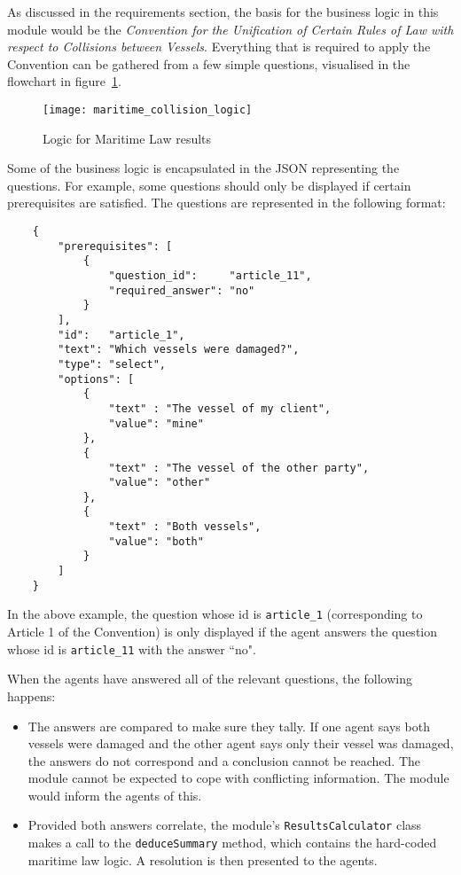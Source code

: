 As discussed in the requirements section, the basis for the business logic in this module would be the \emph{Convention for the Unification of Certain Rules of Law with respect to Collisions between Vessels}. Everything that is required to apply the Convention can be gathered from a few simple questions, visualised in the flowchart in figure~\ref{uml:maritimeLogic}.

\begin{figure}[h!]
  \centering
    \ifimages
    \texttt{[image: maritime\_collision\_logic]}
    \fi
  \caption{Logic for Maritime Law results}
  \label{uml:maritimeLogic}
\end{figure}

Some of the business logic is encapsulated in the JSON representing the questions. For example, some questions should only be displayed if certain prerequisites are satisfied. The questions are represented in the following format:

\begin{minipage}{\textwidth}
\begin{lstlisting}
    {
        "prerequisites": [
            {
                "question_id":     "article_11",
                "required_answer": "no"
            }
        ],
        "id":   "article_1",
        "text": "Which vessels were damaged?",
        "type": "select",
        "options": [
            {
                "text" : "The vessel of my client",
                "value": "mine"
            },
            {
                "text" : "The vessel of the other party",
                "value": "other"
            },
            {
                "text" : "Both vessels",
                "value": "both"
            }
        ]
    }
\end{lstlisting}
\end{minipage}

In the above example, the question whose id is \lstinline{article_1} (corresponding to Article 1 of the Convention) is only displayed if the agent answers the question whose id is \lstinline{article_11} with the answer ``no".

When the agents have answered all of the relevant questions, the following happens:

\begin{itemize}
    \item The answers are compared to make sure they tally. If one agent says both vessels were damaged and the other agent says only their vessel was damaged, the answers do not correspond and a conclusion cannot be reached. The module cannot be expected to cope with conflicting information. The module would inform the agents of this.
    \item Provided both answers correlate, the module's \lstinline{ResultsCalculator} class makes a call to the \lstinline{deduceSummary} method, which contains the hard-coded maritime law logic. A resolution is then presented to the agents.
\end{itemize}

